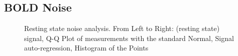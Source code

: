 \subsection{BOLD Noise}
\label{sec:Introduction Noise}
\begin{figure}
\centering
{}
\caption[Resting State Noise Analysis.]{Resting state noise analysis.
From Left to Right:
(resting state) signal, Q-Q Plot of measurements with the standard Normal,
Signal auto-regression, Histogram of the Points}
\label{fig:QQDC}
\end{figure}

